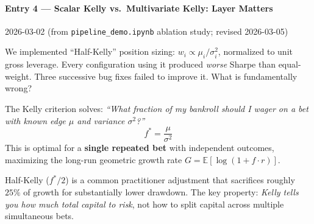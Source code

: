 \documentclass[a4paper, 11pt]{report}
\theoremstyle{definition}
\theoremstyle{remark}
\begin{document}
\paragraph{Entry 4 --- Scalar Kelly vs.\ Multivariate Kelly: Layer Matters}
\label{exp:kelly-lesson}
\begin{description}[style=nextline, leftmargin=1.8cm]
    \item[Date] 2026-03-02 \quad (from \texttt{pipeline\_demo.ipynb} ablation study;
          revised 2026-03-05)

    \item[Question]
        We implemented ``Half-Kelly'' position sizing:
        $w_i \propto \mu_i / \sigma_i^2$, normalized to unit gross leverage.
        Every configuration using it produced \emph{worse} Sharpe than
        equal-weight.  Three successive bug fixes failed to improve it.
        What is fundamentally wrong?

    \item[Background --- The Kelly Formula]
        The Kelly criterion solves: \emph{``What fraction of my bankroll
        should I wager on a bet with known edge $\mu$ and variance
        $\sigma^2$?''}
        \[
            f^* = \frac{\mu}{\sigma^2}
        \]
        This is optimal for a \textbf{single repeated bet} with
        independent outcomes, maximizing the long-run geometric growth
        rate $G = \mathbb{E}[\log(1 + f \cdot r)]$.

        Half-Kelly ($f^*/2$) is a common practitioner adjustment that
        sacrifices roughly $25\%$ of growth for substantially lower
        drawdown.  The key property: \emph{Kelly tells you how much
        total capital to risk}, not how to split capital across
        multiple simultaneous bets.


\end{description}
\end{document}
